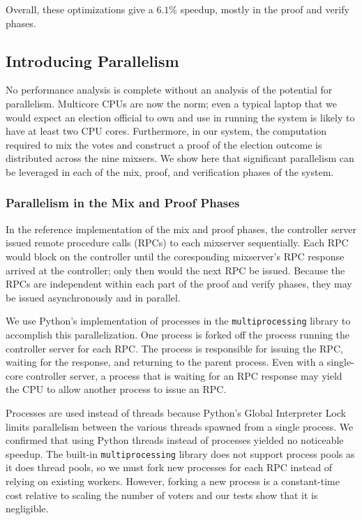 Overall, these optimizations give a $6.1\%$ speedup, mostly in the proof and verify phases.

\subsection{Introducing Parallelism}

No performance analysis is complete without an analysis of the potential for parallelism. Multicore CPUs are now the norm; even a typical laptop that we would expect an election official to own and use in running the system is likely to have at least two CPU cores. Furthermore, in our system, the computation required to mix the votes and construct a proof of the election outcome is distributed across the nine mixsers. We show here that significant parallelism can be leveraged in each of the mix, proof, and verification phases of the system.

\subsubsection{Parallelism in the Mix and Proof Phases}

In the reference implementation of the mix and proof phases, the controller server issued remote procedure calls (RPCs) to each mixserver sequentially. Each RPC would block on the controller until the coresponding mixserver's RPC response arrived at the controller; only then would the next RPC be issued. Because the RPCs are independent within each part of the proof and verify phases, they may be issued asynchronously and in parallel.

We use Python's implementation of processes in the \texttt{multiprocessing} library to accomplish this parallelization. One process is forked off the process running the controller server for each RPC. The process is responsible for issuing the RPC, waiting for the response, and returning to the parent process. Even with a single-core controller server, a process that is waiting for an RPC response may yield the CPU to allow another process to issue an RPC.

Processes are used instead of threads because Python's Global Interpreter Lock limits parallelism between the various threads spawned from a single process. We confirmed that using Python threads instead of processes yielded no noticeable speedup. The built-in \texttt{multiprocessing} library does not support process pools as it does thread pools, so we must fork new processes for each RPC instead of relying on existing workers. However, forking a new process is a constant-time cost relative to scaling the number of voters and our tests show that it is negligible.

